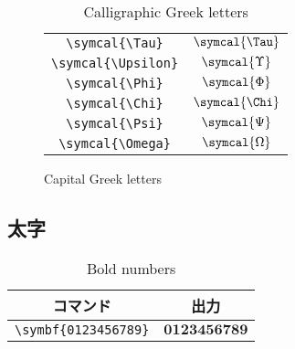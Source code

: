 \begin{table}[htbp]
\begin{subfigure}{.5\textwidth}
\begin{tabular}{cc}
            \verb|\symcal{\Tau}|     & \(\symcal{\Tau}\)     \\
            \verb|\symcal{\Upsilon}| & \(\symcal{\Upsilon}\) \\
            \verb|\symcal{\Phi}|     & \(\symcal{\Phi}\)     \\
            \verb|\symcal{\Chi}|     & \(\symcal{\Chi}\)     \\
            \verb|\symcal{\Psi}|     & \(\symcal{\Psi}\)     \\
            \verb|\symcal{\Omega}|   & \(\symcal{\Omega}\)   \\
            \bottomrule
        \end{tabular}
        \caption{Capital Greek letters}
        \label{fig:capital_greek_cal}
    \end{subfigure}
    \caption{Calligraphic Greek letters}
    \label{tab:calligraphic_greek}
\end{table}

\subsection{太字}

\begin{table}[htbp]
    \centering
    \begin{tabular}{cc}
        \toprule
        コマンド                  & 出力                   \\
        \midrule
        \verb|\symbf{0123456789}| & \(\symbf{0123456789}\) \\
        \bottomrule
    \end{tabular}
    \caption{Bold numbers}
    \label{tab:bold_numbers}
\end{table}

